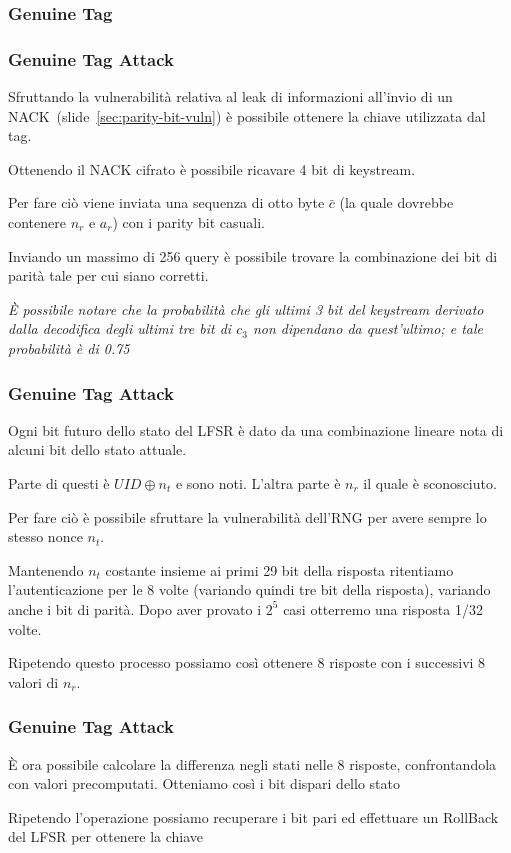 \subsubsection{Genuine Tag}
\begin{frame}
    \frametitle{Genuine Tag Attack}
    Sfruttando la vulnerabilità relativa al leak di informazioni all'invio di un NACK~(slide~\ref{sec:parity-bit-vuln}) è possibile ottenere la chiave utilizzata dal tag.\pause

    Ottenendo il NACK cifrato è possibile ricavare 4 bit di keystream.\pause

    Per fare ciò viene inviata una sequenza di otto byte $\bar{c}$ (la quale dovrebbe contenere $n_r$ e $a_r$) con i parity bit casuali.\pause

    Inviando un massimo di 256 query è possibile trovare la combinazione dei bit di parità tale per cui siano corretti.\pause

    \textit{È possibile notare che la probabilità che gli ultimi 3 bit del keystream derivato dalla decodifica degli ultimi tre bit di $c_3$ non dipendano da quest'ultimo; e tale probabilità è di 0.75 }\cite{Courtois2009TheDS}
\end{frame}

\begin{frame}
    \frametitle{Genuine Tag Attack}
    Ogni bit futuro dello stato del LFSR è dato da una combinazione lineare nota di alcuni bit dello stato attuale.

    Parte di questi è $UID \oplus n_t$ e sono noti. L'altra parte è $n_r$ il quale è sconosciuto.\pause
    
    Per fare ciò è possibile sfruttare la vulnerabilità dell'RNG per avere sempre lo stesso nonce $n_t$.

    Mantenendo $n_t$ costante insieme ai primi 29 bit della risposta ritentiamo l'autenticazione per le 8 volte 
    (variando quindi tre bit della risposta), variando anche i bit di parità. Dopo aver provato i $2^5$ casi otterremo una risposta 1/32 volte. \pause

    Ripetendo questo processo possiamo così ottenere 8 risposte con i successivi 8 valori di $n_r$.
\end{frame}

\begin{frame}
    \frametitle{Genuine Tag Attack}
    È ora possibile calcolare la differenza negli stati nelle 8 risposte, confrontandola con valori precomputati. Otteniamo così i bit dispari dello stato \pause

    Ripetendo l'operazione possiamo recuperare i bit pari ed effettuare un RollBack del LFSR per ottenere la chiave
\end{frame}

